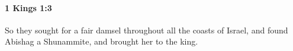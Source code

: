 
		\paragraph{1 Kings 1:3} %
			\label{1KINGS-1-3}

			So they sought for a fair damsel throughout all the coasts of Israel, and found Abishag a Shunammite, and brought her to the king.


